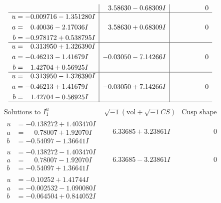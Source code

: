 \documentclass[1p]{elsarticle_modified}
\theoremstyle{definition}
\newcommand{\I}{\sqrt{-1}}
\begin{document}
$$\begin{array}{c|c|c}
 & \phantom{-}3.58630 - 0.68309 I & \phantom{-0.000000 } 0 \\ \hline\begin{aligned}
u &= -0.009716 - 1.351280 I \\
a &= \phantom{-}0.40036 - 2.17036 I \\
b &= -0.978172 + 0.538795 I\end{aligned}
 & \phantom{-}3.58630 + 0.68309 I & \phantom{-0.000000 } 0 \\ \hline\begin{aligned}
u &= \phantom{-}0.313950 + 1.326390 I \\
a &= -0.46213 - 1.41679 I \\
b &= \phantom{-}1.42704 + 0.56925 I\end{aligned}
 & -0.03050 - 7.14266 I & \phantom{-0.000000 } 0 \\ \hline\begin{aligned}
u &= \phantom{-}0.313950 - 1.326390 I \\
a &= -0.46213 + 1.41679 I \\
b &= \phantom{-}1.42704 - 0.56925 I\end{aligned}
 & -0.03050 + 7.14266 I & \phantom{-0.000000 } 0\\
 \hline 
 \end{array}$$\newpage$$\begin{array}{c|c|c}  
\text{Solutions to }I^u_{1}& \I (\text{vol} + \sqrt{-1}CS) & \text{Cusp shape}\\
 \hline 
\begin{aligned}
u &= -0.138272 + 1.403470 I \\
a &= \phantom{-}0.78007 + 1.92070 I \\
b &= -0.54097 - 1.36641 I\end{aligned}
 & \phantom{-}6.33685 + 3.23861 I & \phantom{-0.000000 } 0 \\ \hline\begin{aligned}
u &= -0.138272 - 1.403470 I \\
a &= \phantom{-}0.78007 - 1.92070 I \\
b &= -0.54097 + 1.36641 I\end{aligned}
 & \phantom{-}6.33685 - 3.23861 I & \phantom{-0.000000 } 0 \\ \hline\begin{aligned}
u &= -0.10252 + 1.41744 I \\
a &= -0.002532 - 1.090080 I \\
b &= -0.064504 + 0.844052 I\end{aligned}

\end{array}$$
\end{document}
